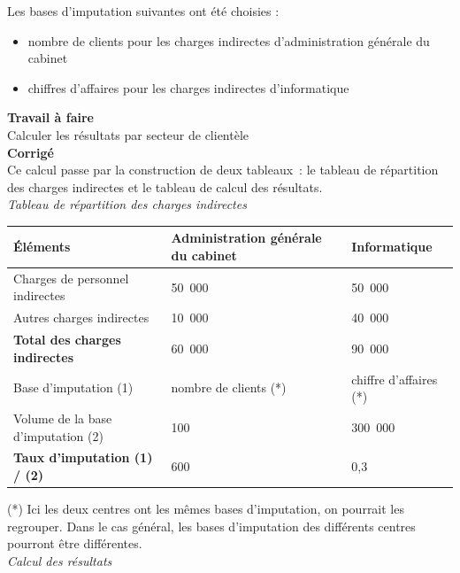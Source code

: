 \documentclass{tufte-handout}
\begin{document}
\begin{enumerate}
Les bases d'imputation suivantes ont été choisies :\\
\begin{itemize}
\item nombre de clients pour les charges indirectes d'administration générale du cabinet\\
\item chiffres d'affaires pour les charges indirectes d'informatique\\
\end{itemize}
\textbf{Travail à faire}\\
Calculer les résultats par secteur de clientèle\\
\textbf{Corrigé}\\
Ce calcul passe par la construction de deux tableaux : le tableau de répartition des charges indirectes et le tableau de calcul des résultats.\\
\emph{Tableau de répartition des charges indirectes}\\
\begin{center}
\begin{tabular}{lll}
Éléments & Administration générale du cabinet & Informatique\\
\hline
Charges de personnel indirectes & 50 000 & 50 000\\
Autres charges indirectes & 10 000 & 40 000\\
\textbf{Total des charges indirectes} & 60 000 & 90 000\\
Base d'imputation (1) & nombre de clients (*) & chiffre d'affaires (*)\\
Volume de la base d'imputation (2) & 100 & 300 000\\
\textbf{Taux d'imputation (1) / (2)} & 600 & 0,3\\
\end{tabular}
\end{center}
(*) Ici les deux centres ont les mêmes bases d'imputation, on pourrait les regrouper. Dans le cas général, les bases d'imputation des différents centres pourront être différentes.\\

\emph{Calcul des résultats}\\


\end{enumerate}
\end{document}
